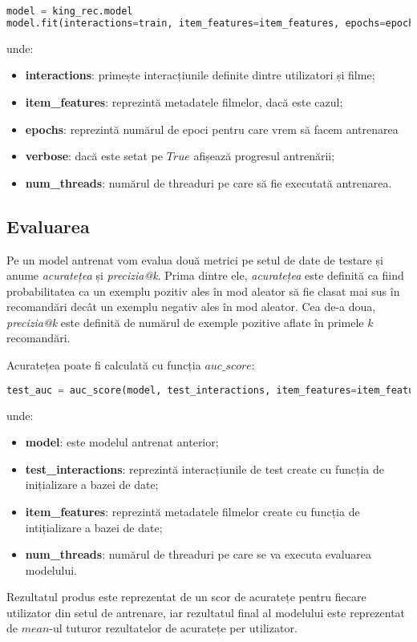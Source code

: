 \begin{lstlisting}[language=Python, caption=Antrenarea modelului]
model = king_rec.model
model.fit(interactions=train, item_features=item_features, epochs=epochs, verbose=True, num_threads=threads)
\end{lstlisting}
unde:
\begin{itemize}
	\item \textbf{interactions}: primește interacțiunile definite dintre utilizatori și filme;
	\item \textbf{item\_features}: reprezintă metadatele filmelor, dacă este cazul;
	\item \textbf{epochs}: reprezintă numărul de epoci pentru care vrem să facem antrenarea
	\item \textbf{verbose}: dacă este setat pe $True$ afișează progresul antrenării;
	\item \textbf{num\_threads}: numărul de threaduri pe care să fie executată antrenarea.
\end{itemize}

\subsection{Evaluarea}
Pe un model antrenat vom evalua două metrici pe setul de date de testare și anume \textit{acuratețea} și \textit{precizia@k}.
Prima dintre ele, \textit{acuratețea} este definită ca fiind probabilitatea ca un exemplu pozitiv ales în mod aleator să fie clasat mai sus în recomandări decât un exemplu negativ ales în mod aleator. Cea de-a doua, \textit{precizia@k} este definită de numărul de exemple pozitive aflate în primele $k$ recomandări.

Acuratețea poate fi calculată cu funcția $auc\_score$:
\begin{lstlisting}[language=Python, caption=Acuratețea unui model]
test_auc = auc_score(model, test_interactions, item_features=item_features, num_threads=threads).mean()
\end{lstlisting}
unde:
\begin{itemize}
	\item \textbf{model}: este modelul antrenat anterior;
	\item \textbf{test\_interactions}: reprezintă interacțiunile de test create cu funcția de inițializare a bazei de date;
	\item \textbf{item\_features}: reprezintă metadatele filmelor create cu funcția de intițializare a bazei de date;
	\item \textbf{num\_threads}: numărul de threaduri pe care se va executa evaluarea modelului.
\end{itemize}
Rezultatul produs este reprezentat de un scor de acuratețe pentru fiecare utilizator din setul de antrenare, iar rezultatul final al modelului este reprezentat de $mean$-ul tuturor rezultatelor de acuratețe per utilizator.

